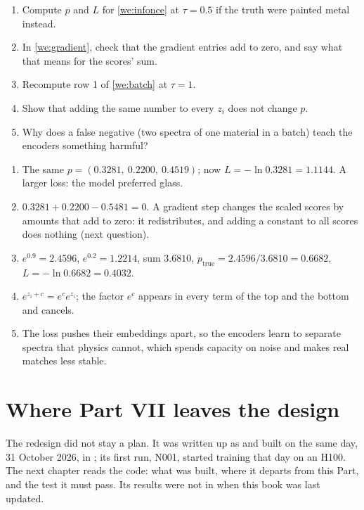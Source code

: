 \documentclass[11pt,a4paper,oneside,openany]{book}
\begin{document}
\begin{checkyourself}
\begin{enumerate}
\item Compute $p$ and $L$ for \cref{we:infonce} at $\tau=0.5$ if the truth were painted metal instead.
\item In \cref{we:gradient}, check that the gradient entries add to zero, and say what that means for the scores' sum.
\item Recompute row 1 of \cref{we:batch} at $\tau=1$.
\item Show that adding the same number to every $z_i$ does not change $p$.
\item Why does a false negative (two spectra of one material in a batch) teach the encoders something harmful?
\end{enumerate}
\end{checkyourself}

\begin{answers}
\begin{enumerate}
\item The same $p=(0.3281,\ 0.2200,\ 0.4519)$; now $L=-\ln0.3281=1.1144$. A larger loss: the model preferred glass.
\item $0.3281+0.2200-0.5481=0$. A gradient step changes the scaled scores by amounts that add to zero: it redistributes, and adding a constant to all scores does nothing (next question).
\item $e^{0.9}=2.4596$, $e^{0.2}=1.2214$, sum $3.6810$, $p_{\text{true}}=2.4596/3.6810=0.6682$, $L=-\ln0.6682=0.4032$.
\item $e^{z_i+c}=e^c e^{z_i}$; the factor $e^c$ appears in every term of the top and the bottom and cancels.
\item The loss pushes their embeddings apart, so the encoders learn to separate spectra that physics cannot, which spends capacity on noise and makes real matches less stable.
\end{enumerate}
\end{answers}

\section{Where Part VII leaves the design}

The redesign did not stay a plan. It was written up as  and built on the same day, 31 October 2026, in
; its first run, N001, started training that day on an H100. The next chapter reads the code: what was built, where it departs from
this Part, and the test it must pass. Its results were not in when this book was last updated.
\end{document}

